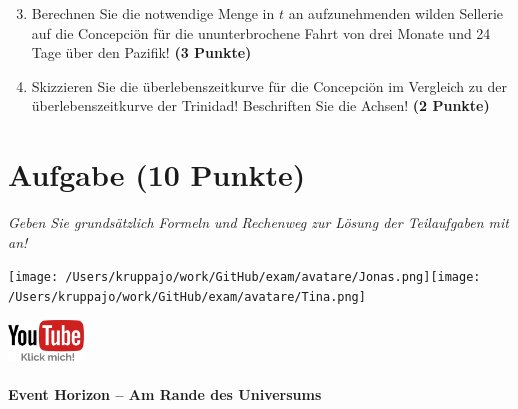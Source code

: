 \documentclass[a4paper, 9pt]{scrartcl}\usepackage[]{graphicx}\usepackage[]{xcolor}
\begin{document}
\begin{enumerate}
  \setcounter{enumi}{2}
\item Berechnen Sie die notwendige Menge in $t$ an aufzunehmenden wilden Sellerie auf die Concepciön für die ununterbrochene Fahrt von drei Monate und 24 Tage über den Pazifik! \textbf{(3 Punkte)}
\item Skizzieren Sie die überlebenszeitkurve für die Concepciön im Vergleich zu der überlebenszeitkurve der Trinidad! Beschriften Sie die Achsen! \textbf{(2 Punkte)}
\end{enumerate}

 
\clearpage

\section{Aufgabe \hfill (10 Punkte)}

\textit{Geben Sie grundsätzlich Formeln und Rechenweg zur Lösung der Teilaufgaben mit an!} \\[1Ex]
 

 
\begin{minipage}[t]{0.5\textwidth}
\texttt{[image: /Users/kruppajo/work/GitHub/exam/avatare/Jonas.png]}\hspace{-4mm}\texttt{[image: /Users/kruppajo/work/GitHub/exam/avatare/Tina.png]}
\end{minipage}
\begin{minipage}[t]{0.5\textwidth}
\hfill
\href{https://youtu.be/q-qYK4Chslg}{\includegraphics[width = 2cm]{img/youtube}}
\end{minipage}




\paragraph{Event Horizon -- Am Rande des Universums}
\end{document}
